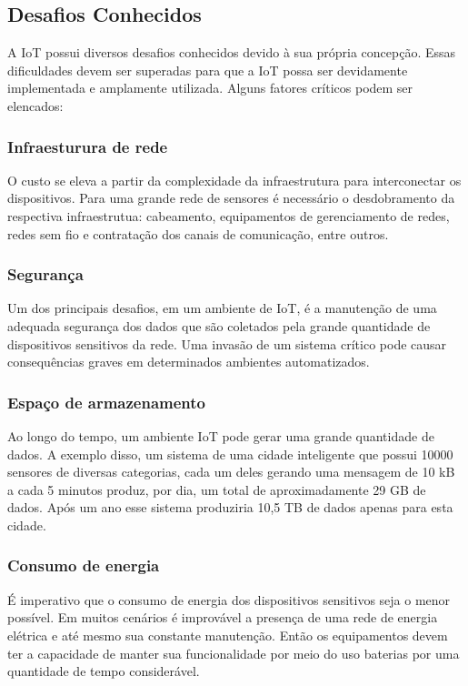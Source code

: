 
\subsection{Desafios Conhecidos}
	\quad A \acrlong{IoT} possui diversos desafios conhecidos devido à sua própria concepção. Essas dificuldades devem ser superadas para que a
	\acrshort{IoT} possa ser devidamente implementada e amplamente utilizada. Alguns fatores críticos podem ser elencados:
	\subsubsection{Infraesturura de rede}
		\quad O custo se eleva a partir da complexidade da infraestrutura para interconectar os dispositivos. Para uma grande rede de sensores é necessário o desdobramento da respectiva infraestrutua:
		 cabeamento, equipamentos de gerenciamento de redes, redes sem fio e contratação dos canais de comunicação, entre outros.
	\subsubsection{Segurança}
		\quad Um dos principais desafios, em um ambiente de \acrlong{IoT}, é a manutenção de uma adequada segurança dos dados que são coletados pela grande quantidade de
		dispositivos sensitivos da rede. Uma invasão de um sistema crítico pode causar consequências graves em determinados ambientes automatizados.
  \subsubsection{Espaço de armazenamento}
	  \quad Ao longo do tempo, um ambiente \acrshort{IoT} pode gerar uma grande quantidade de dados. A exemplo disso, um sistema de uma cidade inteligente que possui 10000 sensores
 	  de diversas categorias, cada um deles gerando uma mensagem de 10 kB a cada 5 minutos produz, por dia, um total de aproximadamente 29 GB de dados.
	  Após um ano esse sistema produziria 10,5 TB de dados apenas para esta cidade.
  \subsubsection{Consumo de energia}
		\quad É imperativo que o consumo de energia dos dispositivos sensitivos seja o menor possível. Em muitos cenários é improvável a presença de uma
		rede de energia elétrica e até mesmo sua constante manutenção. Então os equipamentos devem ter a capacidade de manter sua funcionalidade por meio do uso baterias por
		uma quantidade de tempo considerável.


